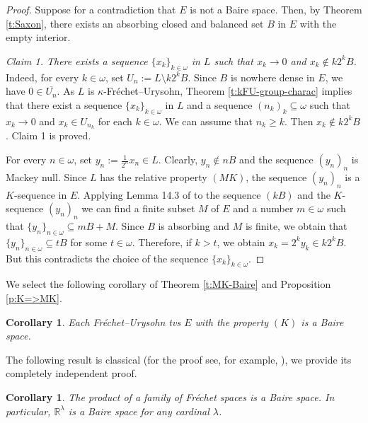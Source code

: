 \documentclass[preprint,11pt]{elsarticle}
\newtheorem{corollary}[theorem]{Corollary}
\theoremstyle{definition}
\theoremstyle{remark}
\numberwithin{equation}{section}
\numberwithin{theorem}{section}
\newcommand{\w}{\omega}
\newcommand{\IR}{\mathbb{R}}
\begin{document}
\begin{proof}
Suppose for a contradiction that $E$ is not a Baire space. Then, by Theorem \ref{t:Saxon}, %
there exists an absorbing closed and balanced set $B$ in $E$ with the empty interior.
\smallskip

{\em Claim 1. There exists a sequence $\{x_k\}_{k\in\w}$ in $L$ such that $x_k \to 0$ and $x_k\notin k2^k B$.} Indeed, for every $k\in\w$, set $U_n:=L\setminus k2^k B$. Since $B$ is nowhere dense in $E$, we have $0\in \overline{U_n}$. As $L$ is $\kappa$-Fr\'{e}chet--Urysohn, Theorem \ref{t:kFU-group-charac} implies that there exist a sequence $\{x_k\}_{k\in\w}$ in $L$ and a sequence $(n_k)_k\subseteq \w$ such that $x_k\to 0$ and $x_k\in U_{n_k}$ for each $k\in \w$. We can assume that $n_k\geq k$. Then $x_k\notin k2^k B$. Claim 1 is proved.
\smallskip

For every $n\in\w$, set $y_n:=\tfrac{1}{2^n} x_n\in L$. Clearly, $y_n\notin n B$ and the sequence $(y_n)_n$ is Mackey null. Since $L$ has the relative property $(MK)$, the sequence $(y_n)_n$ is a $K$-sequence in $E$. Applying Lemma 14.3 of \cite{kak} to the sequence $(kB)$ and the $K$-sequence $(y_n)_n$ we can find a finite subset $M$ of $E$ and a number $m\in\w$ such that $\{y_n\}_{n\in\w} \subseteq mB+M$. Since $B$ is absorbing and $M$ is finite, we obtain that $\{y_n\}_{n\in\w} \subseteq tB$ for some $t\in\w$. Therefore, if $k>t$, we obtain $x_k=2^k y_k\in k 2^k B$. But this contradicts the choice of the sequence $\{x_k\}_{k\in\w}$.
\end{proof}


We select the following corollary of Theorem \ref{t:MK-Baire} and Proposition \ref{p:K=>MK}.


\begin{corollary} \label{c:K+FU=>Baire}
Each Fr\'{e}chet--Urysohn tvs $E$ with the property $(K)$ is a Baire space.
\end{corollary}












The following result is classical (for the proof see, for example, \cite[Theorem~14.2]{kak}), we provide its completely independent proof.
\begin{corollary} \label{c:product-Frechet-Baire}
The product of a family of Fr\'{e}chet spaces is a Baire space. In particular, $\IR^\lambda$ is a Baire space for any cardinal $\lambda$.
\end{corollary}
\end{document}
